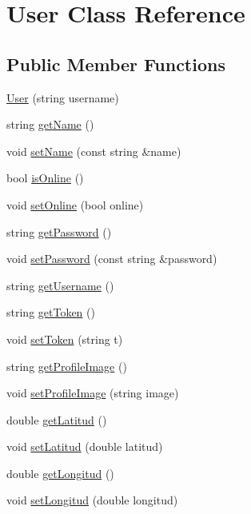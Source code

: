 \hypertarget{classUser}{\section{User Class Reference}
\label{classUser}
}
\subsection*{Public Member Functions}
\begin{DoxyCompactItemize}
\item 
\hyperlink{classUser_a79cb2c4bc5ad9221a6e55b6a0981a27e}{User} (string username)
\item 
string \hyperlink{classUser_adb316ac38d5f62a967686e7b736a0469}{get\-Name} ()
\item 
void \hyperlink{classUser_ac44eb16e566dd060399e8f87ceec3fac}{set\-Name} (const string \&name)
\item 
bool \hyperlink{classUser_a73952dc0320736f3532e0037ae27cfef}{is\-Online} ()
\item 
void \hyperlink{classUser_a9cbe82e7191959323c3d380b6e78bf33}{set\-Online} (bool online)
\item 
string \hyperlink{classUser_a090eb9ee354cc25b2e8240b714b39d64}{get\-Password} ()
\item 
void \hyperlink{classUser_a00ba1579772decc59ab7f97bc262ce4a}{set\-Password} (const string \&password)
\item 
string \hyperlink{classUser_a5705c32c347050449ba6d72f32f18482}{get\-Username} ()
\item 
string \hyperlink{classUser_a700372bc6d19cbac725465de917b38a3}{get\-Token} ()
\item 
void \hyperlink{classUser_abc940c6478909bdf61acc5cfec24f189}{set\-Token} (string t)
\item 
string \hyperlink{classUser_abde67d56392ae39f8f9a47dae95f4220}{get\-Profile\-Image} ()
\item 
void \hyperlink{classUser_acc6da9f66ccdea972de126acadc3f69f}{set\-Profile\-Image} (string image)
\item 
double \hyperlink{classUser_a78ff4937b992a5a53c2fdc30be97507d}{get\-Latitud} ()
\item 
void \hyperlink{classUser_ad79d7b69bcf6e0b9070dcd539884d0f8}{set\-Latitud} (double latitud)
\item 
double \hyperlink{classUser_a811258c8bd9966d530297feb60619795}{get\-Longitud} ()
\item 
void \hyperlink{classUser_aafdb669757a37e09d56c412d69835144}{set\-Longitud} (double longitud)

\end{DoxyCompactItemize}
